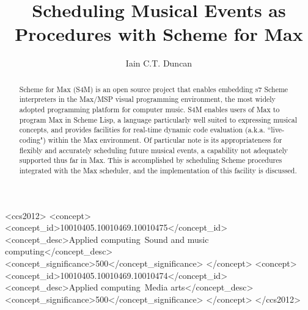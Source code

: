 \documentclass[acmsmall]{acmart}
\begin{document}
\title{Scheduling Musical Events as Procedures with Scheme for Max}

\author{Iain C.T. Duncan}


\renewcommand{\shortauthors}{Duncan}

\begin{abstract}
Scheme for Max (S4M) is an open source project that enables embedding 
s7 Scheme interpreters in the Max/MSP visual programming environment,
the most widely adopted programming platform for computer music.
S4M enables users of Max to program Max in Scheme Lisp, a language particularly 
well suited to expressing musical concepts, and provides facilities for 
real-time dynamic code evaluation (a.k.a. ``live-coding") within the
Max environment. Of particular note is its appropriateness for flexibly
and accurately scheduling future musical events, a capability not
adequately supported thus far in Max. This is accomplished by scheduling
Scheme procedures integrated with the Max scheduler, and the 
implementation of this facility is discussed.

\end{abstract}


\begin{CCSXML}
<ccs2012>
<concept>
<concept_id>10010405.10010469.10010475</concept_id>
<concept_desc>Applied computing~Sound and music computing</concept_desc>
<concept_significance>500</concept_significance>
</concept>
<concept>
<concept_id>10010405.10010469.10010474</concept_id>
<concept_desc>Applied computing~Media arts</concept_desc>
<concept_significance>500</concept_significance>
</concept>
</ccs2012>
\end{CCSXML}
\end{document}

